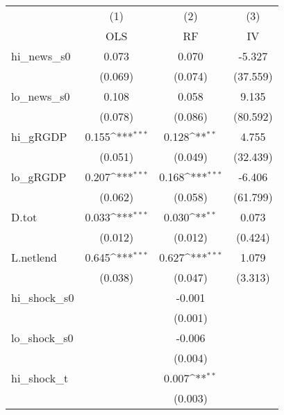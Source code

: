 {
\def\sym#1{\ifmmode^{#1}\else\(^{#1}\)\fi}
\begin{tabular}{l*{3}{c}}
\toprule
            &\multicolumn{1}{c}{(1)}&\multicolumn{1}{c}{(2)}&\multicolumn{1}{c}{(3)}\\
            &\multicolumn{1}{c}{OLS}&\multicolumn{1}{c}{RF}&\multicolumn{1}{c}{IV}\\
\midrule
hi\_news\_s0  &       0.073         &       0.070         &      -5.327         \\
            &     (0.069)         &     (0.074)         &    (37.559)         \\
\addlinespace
lo\_news\_s0  &       0.108         &       0.058         &       9.135         \\
            &     (0.078)         &     (0.086)         &    (80.592)         \\
\addlinespace
hi\_gRGDP    &       0.155\sym{***}&       0.128\sym{**} &       4.755         \\
            &     (0.051)         &     (0.049)         &    (32.439)         \\
\addlinespace
lo\_gRGDP    &       0.207\sym{***}&       0.168\sym{***}&      -6.406         \\
            &     (0.062)         &     (0.058)         &    (61.799)         \\
\addlinespace
D.tot       &       0.033\sym{***}&       0.030\sym{**} &       0.073         \\
            &     (0.012)         &     (0.012)         &     (0.424)         \\
\addlinespace
L.netlend   &       0.645\sym{***}&       0.627\sym{***}&       1.079         \\
            &     (0.038)         &     (0.047)         &     (3.313)         \\
\addlinespace
hi\_shock\_s0 &                     &      -0.001         &                     \\
            &                     &     (0.001)         &                     \\
\addlinespace
lo\_shock\_s0 &                     &      -0.006         &                     \\
            &                     &     (0.004)         &                     \\
\addlinespace
hi\_shock\_t  &                     &       0.007\sym{**} &                     \\
            &                     &     (0.003)         &                     \\

\end{tabular}}
